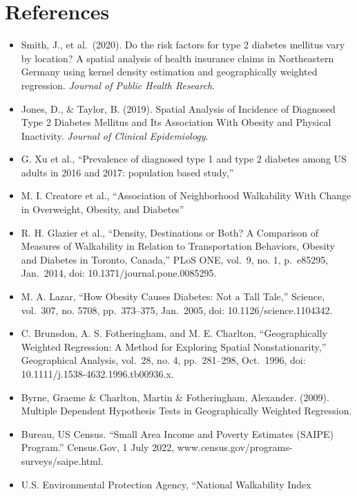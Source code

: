\documentclass[
]{article}
\providecommand{\tightlist}{%
  \setlength{\itemsep}{0pt}\setlength{\parskip}{0pt}}\usepackage{longtable,booktabs,array}
\begin{document}
\newpage{}

\section{References}\label{references}

\begin{itemize}
\tightlist
\item
  Smith, J., et al.~(2020). Do the risk factors for type 2 diabetes
  mellitus vary by location? A spatial analysis of health insurance
  claims in Northeastern Germany using kernel density estimation and
  geographically weighted regression. \emph{Journal of Public Health
  Research}.
\item
  Jones, D., \& Taylor, B. (2019). Spatial Analysis of Incidence of
  Diagnosed Type 2 Diabetes Mellitus and Its Association With Obesity
  and Physical Inactivity. \emph{Journal of Clinical Epidemiology}.
\item
  G. Xu et al., ``Prevalence of diagnosed type 1 and type 2 diabetes
  among US adults in 2016 and 2017: population based study,''
\item
  M. I. Creatore et al., ``Association of Neighborhood Walkability With
  Change in Overweight, Obesity, and Diabetes''
\item
  R. H. Glazier et al., ``Density, Destinations or Both? A Comparison of
  Measures of Walkability in Relation to Transportation Behaviors,
  Obesity and Diabetes in Toronto, Canada,'' PLoS ONE, vol.~9, no. 1,
  p.~e85295, Jan.~2014, doi: 10.1371/journal.pone.0085295.
\item
  M. A. Lazar, ``How Obesity Causes Diabetes: Not a Tall Tale,''
  Science, vol.~307, no. 5708, pp.~373--375, Jan.~2005, doi:
  10.1126/science.1104342.
\item
  C. Brunsdon, A. S. Fotheringham, and M. E. Charlton, ``Geographically
  Weighted Regression: A Method for Exploring Spatial Nonstationarity,''
  Geographical Analysis, vol.~28, no. 4, pp.~281--298, Oct.~1996, doi:
  10.1111/j.1538-4632.1996.tb00936.x.
\item
  Byrne, Graeme \& Charlton, Martin \& Fotheringham, Alexander. (2009).
  Multiple Dependent Hypothesis Tests in Geographically Weighted
  Regression.
\item
  Bureau, US Census. ``Small Area Income and Poverty Estimates (SAIPE)
  Program.'' Census.Gov, 1 July 2022,
  www.census.gov/programs-surveys/saipe.html.
\item
  U.S. Environmental Protection Agency, ``National Walkability Index

\end{itemize}
\end{document}
